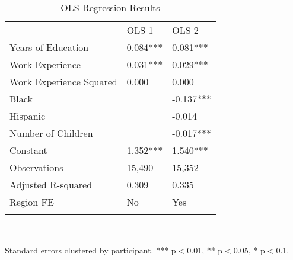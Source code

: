 \begin{table}[h] \centering
{}

\caption{OLS Regression Results}
{\footnotesize
\begin{tabularx}{0.5\linewidth}{@{}lCC@{}}

\toprule
&OLS 1&OLS 2 \tabularnewline
Years of Education&0.084***&0.081*** \tabularnewline
\midrule Work Experience&0.031***&0.029*** \tabularnewline
Work Experience Squared&0.000&0.000 \tabularnewline
Black&&-0.137*** \tabularnewline
Hispanic&&-0.014 \tabularnewline
Number of Children&&-0.017*** \tabularnewline
\midrule Constant&1.352***&1.540*** \tabularnewline
Observations&15,490&15,352 \tabularnewline
Adjusted R-squared&0.309&0.335 \tabularnewline
Region FE&No&Yes \tabularnewline
\bottomrule \addlinespace[\belowrulesep]

\end{tabularx}
\\ \parbox{0.5\linewidth}{\footnotesize Standard errors clustered by participant. *** p$<$0.01, ** p$<$0.05, * p$<$0.1.}
}
\end{table}
